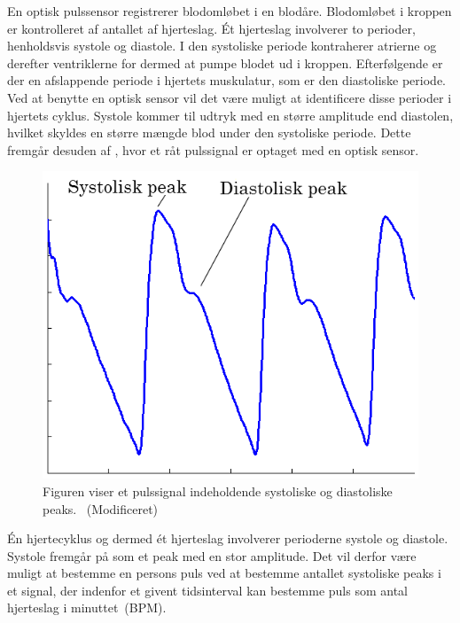 En optisk pulssensor registrerer blodomløbet i en blodåre. Blodomløbet i kroppen er kontrolleret af antallet af hjerteslag. Ét hjerteslag involverer to perioder, henholdsvis systole og diastole. I den systoliske periode kontraherer atrierne og derefter ventriklerne for dermed at pumpe blodet ud i kroppen. Efterfølgende er der en afslappende periode i hjertets muskulatur, som er den diastoliske periode. \newline
Ved at benytte en optisk sensor vil det være muligt at identificere disse perioder i hjertets cyklus. Systole kommer til udtryk med en større amplitude end diastolen, hvilket skyldes en større mængde blod under den systoliske periode. Dette fremgår desuden af , hvor et råt pulssignal er optaget med en optisk sensor.~\citep{Martini2012}
\begin{figure}[H]
	\centering
	\includegraphics[scale=0.3]{figures/cDesign/puls_goldenstand.png}
	\caption{Figuren viser et pulssignal indeholdende systoliske og diastoliske peaks.~\citep{GanZahedi2011} (Modificeret)}
	\label{fig:puls_goldenstand}
\end{figure}\vspace{-0.25cm}
Én hjertecyklus og dermed ét hjerteslag involverer perioderne systole og diastole. Systole fremgår på  som et peak med en stor amplitude. Det vil derfor være muligt at bestemme en persons puls ved at bestemme antallet systoliske peaks i et signal, der indenfor et givent tidsinterval kan bestemme puls som antal hjerteslag i minuttet~(BPM).